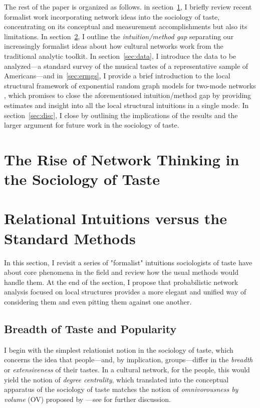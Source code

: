 \documentclass[preprint,12pt,authoryear]{elsarticle}
\begin{document}
The rest of the paper is organized as follows. in section~\ref{sec:networks}, I briefly review recent formalist work incorporating network ideas into the sociology of taste, concentrating on its conceptual and measurement accomplishments but also its limitations. In section~\ref{sec:localstruct}, I outline the \textit{intuition/method gap} separating our increasingly formalist ideas about how cultural networks work from the traditional analytic toolkit. In section~\ref{sec:data}, I introduce the data to be analyzed---a standard survey of the musical tastes of a representative sample of Americans---and in~\ref{sec:ermgs}, I provide a brief introduction to the local structural framework of exponential random graph models for two-mode networks \citep{pattison2002neighborhood}, which promises to close the aforementioned intuition/method gap by providing estimates and insight into all the local structural intuitions in a single mode. In section~\ref{sec:disc}, I close by outlining the implications of the results and the larger argument for future work in the sociology of taste. 

\section{The Rise of Network Thinking in the Sociology of Taste}
\label{sec:networks}

\section{Relational Intuitions versus the Standard Methods}
\label{sec:localstruct}

In this section, I revisit a series of "formalist" intuitions sociologists of taste have about core phenomena in the field and review how the usual methods would handle them. At the end of the section, I propose that probabilistic network analysis focused on local structures provides a more elegant and unified way of considering them and even pitting them against one another. 

\subsection{Breadth of Taste and Popularity}
I begin with the simplest relationist notion in the sociology of taste, which concerns the idea that people---and, by implication, groups---differ in the \textit{breadth} or \textit{extensiveness} of their tastes. In a cultural network, for the people, this would yield the notion of \textit{degree centrality}, which translated into the conceptual apparatus of the sociology of taste matches the notion of \textit{omnivorousness by volume} (OV) proposed by \citet{warde2009anatomy}---see \citet{lizardo2014omnivorousness} for further discussion. 
\end{document}
